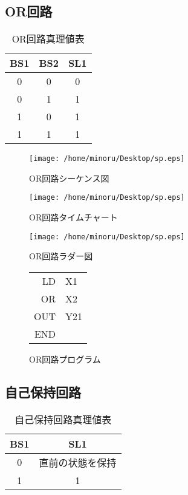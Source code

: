 \documentclass{jsarticle}
\begin{document}
\subsection{OR回路}
\begin{table}[hbtp]
 \centering
 \caption{OR回路真理値表}
 \begin{tabular}{|c|c|c|}\hline
 BS1&BS2&SL1\\ \hline\hline
 0&0&0\\ \hline
 0&1&1\\ \hline
 1&0&1\\ \hline
 1&1&1\\ \hline
 \end{tabular}
\end{table}

\begin{figure}[hbtp]
 \centering
 \texttt{[image: /home/minoru/Desktop/sp.eps]}
 \caption{OR回路シーケンス図}
\end{figure}

\begin{figure}[hbtp]
 \texttt{[image: /home/minoru/Desktop/sp.eps]}
 \caption{OR回路タイムチャート}
\end{figure}
\begin{figure}[hbtp]
 \texttt{[image: /home/minoru/Desktop/sp.eps]}
 \caption{OR回路ラダー図}
\end{figure}
\begin{figure}[htbp]
\centering
\begin{tabular}{rl}
LD&X1\\
OR&X2\\
OUT&Y21\\
END&\\
\end{tabular}
\caption{OR回路プログラム}
\end{figure}
\newpage
\subsection{自己保持回路}
\begin{table}[hbtp]
 \centering
 \caption{自己保持回路真理値表}
 \begin{tabular}{|c|c|}\hline
 BS1&SL1\\ \hline\hline
 0&直前の状態を保持\\ \hline
 1&1\\ \hline
 \end{tabular}
\end{table}
\end{document}
